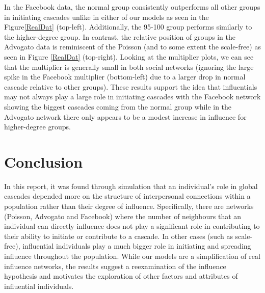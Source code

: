 \documentclass[10pt, oneside, reqno]{amsart}
\theoremstyle{plain}%
\theoremstyle{definition}
\theoremstyle{remark}
\begin{document}
In the Facebook data, the normal group consistently outperforms all other groups in initiating cascades unlike in either of our models as seen in the Figure\ref{RealDat} (top-left).
Additionally, the 95-100 group performs similarly to the higher-degree group.
In contrast, the relative position of groups in the Advogato data is reminiscent of the Poisson (and to some extent the scale-free) as seen in Figure \ref{RealDat} (top-right).
Looking at the multiplier plots, we can see that the multiplier is generally small in both social networks (ignoring the large spike in the Facebook multiplier (bottom-left) due to a larger drop in normal cascade relative to other groups).
These results support the idea that influentials may not always play a large role in initiating cascades with the Facebook network showing the biggest cascades coming from the normal group while in the Advogato network there only appears to be a modest increase in influence for higher-degree groups.





\section{Conclusion}

In this report, it was found through simulation that an individual's role in global cascades depended more on the structure of interpersonal connections within a population rather than their degree of influence.
Specifically, there are networks (Poisson, Advogato and Facebook) where the number of neighbours that an individual can directly influence does not play a significant role in contributing to their ability to initiate or contribute to a cascade.
In other cases (such as scale-free), influential individuals play a much bigger role in initiating and spreading influence throughout the population. 
While our models are a simplification of real influence networks, the results suggest a reexamination of the influence hypothesis and motivates the exploration of other factors and attributes of influential individuals.


\end{document}
